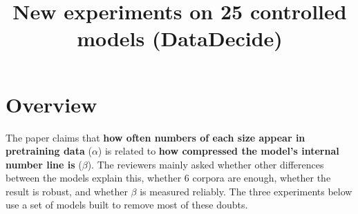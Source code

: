 \documentclass[11pt]{article}
\title{New experiments on 25 controlled models (DataDecide)}
\date{}
\begin{document}
\maketitle

\section{Overview}

The paper claims that \textbf{how often numbers of each size appear in pretraining data} ($\alpha$) is
related to \textbf{how compressed the model's internal number line is} ($\beta$). The reviewers mainly
asked whether other differences between the models explain this, whether 6 corpora are enough,
whether the result is robust, and whether $\beta$ is measured reliably. The three experiments below
use a set of models built to remove most of these doubts.
\end{document}
